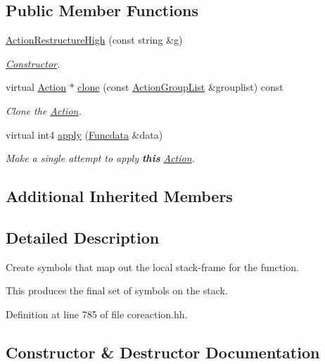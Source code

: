 \subsection*{Public Member Functions}
\begin{DoxyCompactItemize}
\item 
\mbox{\hyperlink{class_action_restructure_high_a8ca9db4ae43343f88fe2e1027b94f4d1}{Action\+Restructure\+High}} (const string \&g)
\begin{DoxyCompactList}\small\item\em \mbox{\hyperlink{class_constructor}{Constructor}}. \end{DoxyCompactList}\item 
virtual \mbox{\hyperlink{class_action}{Action}} $\ast$ \mbox{\hyperlink{class_action_restructure_high_a1180b8277ebd3c5ce38c86fe7a72c0db}{clone}} (const \mbox{\hyperlink{class_action_group_list}{Action\+Group\+List}} \&grouplist) const
\begin{DoxyCompactList}\small\item\em Clone the \mbox{\hyperlink{class_action}{Action}}. \end{DoxyCompactList}\item 
virtual int4 \mbox{\hyperlink{class_action_restructure_high_aeeacf5bf4d99c638c486a23b69f19207}{apply}} (\mbox{\hyperlink{class_funcdata}{Funcdata}} \&data)
\begin{DoxyCompactList}\small\item\em Make a single attempt to apply {\bfseries{this}} \mbox{\hyperlink{class_action}{Action}}. \end{DoxyCompactList}\end{DoxyCompactItemize}
\subsection*{Additional Inherited Members}


\subsection{Detailed Description}
Create symbols that map out the local stack-\/frame for the function. 

This produces the final set of symbols on the stack. 

Definition at line 785 of file coreaction.\+hh.



\subsection{Constructor \& Destructor Documentation}
\mbox{\label{class_action_restructure_high_a8ca9db4ae43343f88fe2e1027b94f4d1}} 
